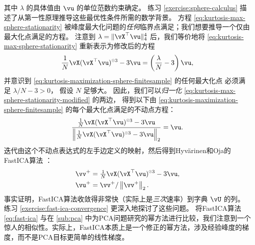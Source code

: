 \documentclass[../../book-main.tex]{subfiles}
\begin{document}
其中 $\lambda$ 的具体值由 $\vu$ 的单位范数约束确定。
练习 \ref{exercise:sphere-calculus} 描述了从第一性原理推导这些最优性条件所需的数学背景。
方程 \eqref{eq:kurtosis-max-sphere-stationarity} 被峰度最大化问题的\textit{任何}临界点满足；我们想要推导一个仅由最大化点满足的方程。
注意到 $\lambda = \norm{\vX^\top \vu}_4^4$ 后，我们等价地将 \eqref{eq:kurtosis-max-sphere-stationarity} 重新表示为修改后的方程
\begin{align}\label{eq:kurtosis-max-sphere-stationarity-modified}
   \frac{1}{N}\vX (\vX^\top \vu)^{\hada 3} 
   - 
   3 \vu
   = 
   \left(
   \frac{\lambda}{N} - 3
   \right)
   \vu,
\end{align}
并意识到 \eqref{eq:kurtosis-maximization-sphere-finitesample} 的任何最大化点
必须满足 $\lambda / N - 3 > 0$，
假设 $N$ 足够大。
因此，我们可以\textit{归一化} \eqref{eq:kurtosis-max-sphere-stationarity-modified} 的两边，
得到以下由 \eqref{eq:kurtosis-maximization-sphere-finitesample} 的每个最大化点满足的不动点方程：
\begin{align}\label{eq:kurtosis-max-sphere-fxp}
\frac{
   \frac{1}{N}\vX (\vX^\top \vu)^{\hada 3} 
   - 
   3 \vu
   }{
   \norm*{
   \frac{1}{N}\vX (\vX^\top \vu)^{\hada 3} 
   - 
   3 \vu
   }_2
   }
   =
   \vu.
\end{align}
迭代由这个不动点表达式的左手边定义的映射，然后得到Hyv\"{a}rinen和Oja的FastICA算法 \cite{hyvarinen-1997}：
\begin{equation}
\begin{split}\label{eq:fast-ica}
   \vv^+ &= \tfrac{1}{N}\vX (\vX^\top \vu)^{\hada 3}- 3 \vu
   ,  \\
   \vu^+ &= \vv^+ / \norm*{\vv^+}_2.
   \end{split}
\end{equation}
事实证明，FastICA算法收敛得非常快（实际上是\textit{三次}速率）到字典 $\vU$ 的列。
练习 \ref{exercise:fast-ica-convergence} 更深入地探讨了这些问题。 %
将FastICA算法 \eqref{eq:fast-ica} 与在 \ref{sub:pca} 中为PCA问题研究的幂方法进行比较，我们注意到一个惊人的相似性。实际上，FastICA本质上是一个修正的幂方法，涉及经验峰度的梯度，而不是PCA目标更简单的线性梯度。

\end{document}
